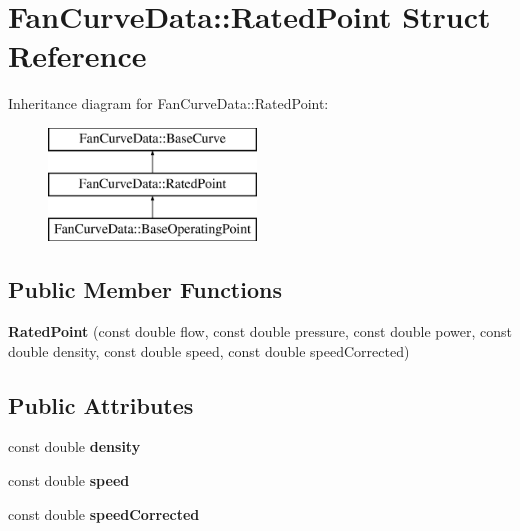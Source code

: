\hypertarget{struct_fan_curve_data_1_1_rated_point}{}\section{Fan\+Curve\+Data\+:\+:Rated\+Point Struct Reference}
\label{struct_fan_curve_data_1_1_rated_point}
Inheritance diagram for Fan\+Curve\+Data\+:\+:Rated\+Point\+:\begin{figure}[H]
\begin{center}
\leavevmode
\includegraphics[height=3.000000cm]{d2/da5/struct_fan_curve_data_1_1_rated_point}
\end{center}
\end{figure}
\subsection*{Public Member Functions}
\begin{DoxyCompactItemize}
\item 
\mbox{\label{struct_fan_curve_data_1_1_rated_point_a023280b292b8e407d81c433848189f05}} 
{\bfseries Rated\+Point} (const double flow, const double pressure, const double power, const double density, const double speed, const double speed\+Corrected)
\end{DoxyCompactItemize}
\subsection*{Public Attributes}
\begin{DoxyCompactItemize}
\item 
\mbox{\label{struct_fan_curve_data_1_1_rated_point_ae85a258074490d9691d6ebac53c38b81}} 
const double {\bfseries density}
\item 
\mbox{\label{struct_fan_curve_data_1_1_rated_point_a48f6364f9e14b8a204fef020f967254e}} 
const double {\bfseries speed}
\item 
\mbox{\label{struct_fan_curve_data_1_1_rated_point_a845b68ddecfbdbf42c9ea6f0df607a03}} 
const double {\bfseries speed\+Corrected}
\end{DoxyCompactItemize}
